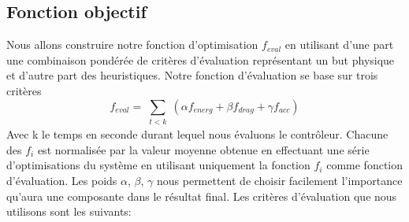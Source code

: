 \documentclass[runningheads,a4paper]{llncs}
\begin{document}
\subsection{Fonction objectif}
%
Nous allons construire notre fonction d'optimisation $f_{eval}$ en utilisant d'une part une combinaison pondérée de critères d'évaluation représentant un but physique et d'autre part des heuristiques. Notre fonction d'évaluation se base sur trois critères 
\begin{equation}
f_{eval}=\sum_{\substack{t<k}} (\alpha f_{energ} + \beta f_{drag} + \gamma f_{acc})
\label{eq:simple_objective}
\end{equation}
Avec k le temps en seconde durant lequel nous évaluons le contrôleur.
Chacune des $f_i$ est normalisée par la valeur moyenne obtenue en effectuant une série d'optimisations du système en utilisant uniquement la fonction $f_i$ comme fonction d'évaluation. Les poids $\alpha$, $\beta$, $\gamma$ nous permettent de choisir facilement l'importance qu'aura une composante dans le résultat final. Les critères d'évaluation que nous utilisons sont les suivants:
\end{document}

